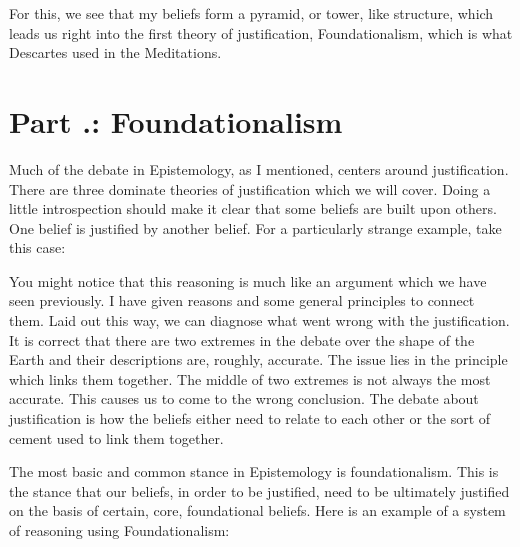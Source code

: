 For this, we see that my beliefs form a pyramid, or tower, like structure, which leads us right into the first theory of justification, Foundationalism, which is what Descartes used in the Meditations.

\section{Part \thechapcount.\theseccount: Foundationalism}
Much of the debate in Epistemology, as I mentioned, centers around justification. There are three dominate theories of justification which we will cover. Doing a little introspection should make it clear that some beliefs are built upon others. One belief is justified by another belief. For a particularly strange example, take this case: 


You might notice that this reasoning is much like an argument which we have seen previously. I have given reasons and some general principles to connect them. Laid out this way, we can diagnose what went wrong with the justification. It is correct that there are two extremes in the debate over the shape of the Earth and their descriptions are, roughly, accurate. The issue lies in the principle which links them together. The middle of two extremes is not always the most accurate. This causes us to come to the wrong conclusion. The debate about justification is how the beliefs either need to relate to each other or the sort of cement used to link them together.

The most basic and common stance in Epistemology is \Gls{foundationalism}. This is the stance that our beliefs, in order to be justified, need to be ultimately justified on the basis of certain, core, foundational beliefs. Here is an example of a system of reasoning using Foundationalism: 


